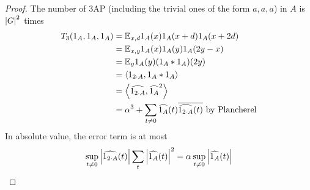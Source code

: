 \documentclass{article}
\begin{document}
\begin{proof}
  The number of 3AP (including the trivial ones of the form $a, a, a$) in $A$ is $\left\lvert G\right\rvert^2$ times
  \begin{align*}
    T_3(1_A, 1_A, 1_A)
    & = \mathbb E_{x, d} 1_A(x) 1_A(x + d) 1_A(x + 2d) \\
    & = \mathbb E_{x, y} 1_A(x) 1_A(y) 1_A(2y - x) \\
    & = \mathbb E_y 1_A(y) (1_A \ast 1_A)(2y) \\
    & = \left\langle 1_{2 \cdot A}, 1_A \ast 1_A\right\rangle \\
    & = \left\langle \widehat{1_{2 \cdot A}}, \widehat{1_A}^2\right\rangle \\
    & = \alpha^3 + \sum_{t \ne 0} \widehat{1_A}(t) \overline{\widehat{1_{2 \cdot A}}(t)} \text{ by Plancherel}
  \end{align*}
  In absolute value, the error term is at most
  $$\sup_{t \ne 0} \left\lvert \widehat{1_{2 \cdot A}}(t)\right\rvert \sum_t \left\lvert \widehat{1_A}(t)\right\rvert^2 = \alpha \sup_{t \ne 0} \left\lvert \widehat{1_A}(t)\right\rvert$$
\end{proof}
\end{document}
